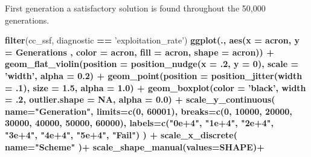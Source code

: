 \documentclass[]{book}
\newenvironment{Shaded}{\begin{snugshade}}{\end{snugshade}}
\newcommand{\DataTypeTok}[1]{\textcolor[rgb]{0.13,0.29,0.53}{#1}}
\newcommand{\DecValTok}[1]{\textcolor[rgb]{0.00,0.00,0.81}{#1}}
\newcommand{\FloatTok}[1]{\textcolor[rgb]{0.00,0.00,0.81}{#1}}
\newcommand{\KeywordTok}[1]{\textcolor[rgb]{0.13,0.29,0.53}{\textbf{#1}}}
\newcommand{\NormalTok}[1]{#1}
\newcommand{\OperatorTok}[1]{\textcolor[rgb]{0.81,0.36,0.00}{\textbf{#1}}}
\newcommand{\OtherTok}[1]{\textcolor[rgb]{0.56,0.35,0.01}{#1}}
\newcommand{\StringTok}[1]{\textcolor[rgb]{0.31,0.60,0.02}{#1}}
\begin{document}
First generation a satisfactory solution is found throughout the 50,000 generations.

\begin{Shaded}
\begin{Highlighting}[]
\KeywordTok{filter}\NormalTok{(cc_ssf, diagnostic }\OperatorTok{==}\StringTok{ 'exploitation_rate'}\NormalTok{) }\OperatorTok{%>%}
\StringTok{  }\KeywordTok{ggplot}\NormalTok{(., }\KeywordTok{aes}\NormalTok{(}\DataTypeTok{x =}\NormalTok{ acron, }\DataTypeTok{y =}\NormalTok{ Generations , }\DataTypeTok{color =}\NormalTok{ acron, }\DataTypeTok{fill =}\NormalTok{ acron, }\DataTypeTok{shape =}\NormalTok{ acron)) }\OperatorTok{+}
\StringTok{  }\KeywordTok{geom_flat_violin}\NormalTok{(}\DataTypeTok{position =} \KeywordTok{position_nudge}\NormalTok{(}\DataTypeTok{x =} \FloatTok{.2}\NormalTok{, }\DataTypeTok{y =} \DecValTok{0}\NormalTok{), }\DataTypeTok{scale =} \StringTok{'width'}\NormalTok{, }\DataTypeTok{alpha =} \FloatTok{0.2}\NormalTok{) }\OperatorTok{+}
\StringTok{  }\KeywordTok{geom_point}\NormalTok{(}\DataTypeTok{position =} \KeywordTok{position_jitter}\NormalTok{(}\DataTypeTok{width =} \FloatTok{.1}\NormalTok{), }\DataTypeTok{size =} \FloatTok{1.5}\NormalTok{, }\DataTypeTok{alpha =} \FloatTok{1.0}\NormalTok{) }\OperatorTok{+}
\StringTok{  }\KeywordTok{geom_boxplot}\NormalTok{(}\DataTypeTok{color =} \StringTok{'black'}\NormalTok{, }\DataTypeTok{width =} \FloatTok{.2}\NormalTok{, }\DataTypeTok{outlier.shape =} \OtherTok{NA}\NormalTok{, }\DataTypeTok{alpha =} \FloatTok{0.0}\NormalTok{) }\OperatorTok{+}
\StringTok{  }\KeywordTok{scale_y_continuous}\NormalTok{(}
    \DataTypeTok{name=}\StringTok{"Generation"}\NormalTok{,}
    \DataTypeTok{limits=}\KeywordTok{c}\NormalTok{(}\DecValTok{0}\NormalTok{, }\DecValTok{60001}\NormalTok{),}
    \DataTypeTok{breaks=}\KeywordTok{c}\NormalTok{(}\DecValTok{0}\NormalTok{, }\DecValTok{10000}\NormalTok{, }\DecValTok{20000}\NormalTok{, }\DecValTok{30000}\NormalTok{, }\DecValTok{40000}\NormalTok{, }\DecValTok{50000}\NormalTok{, }\DecValTok{60000}\NormalTok{),}
    \DataTypeTok{labels=}\KeywordTok{c}\NormalTok{(}\StringTok{"0e+4"}\NormalTok{, }\StringTok{"1e+4"}\NormalTok{, }\StringTok{"2e+4"}\NormalTok{, }\StringTok{"3e+4"}\NormalTok{, }\StringTok{"4e+4"}\NormalTok{, }\StringTok{"5e+4"}\NormalTok{, }\StringTok{"Fail"}\NormalTok{)}
\NormalTok{  ) }\OperatorTok{+}
\StringTok{  }\KeywordTok{scale_x_discrete}\NormalTok{(}
    \DataTypeTok{name=}\StringTok{"Scheme"}
\NormalTok{  )}\OperatorTok{+}
\StringTok{  }\KeywordTok{scale_shape_manual}\NormalTok{(}\DataTypeTok{values=}\NormalTok{SHAPE)}\OperatorTok{+}
}
\end{Highlighting}
\end{Shaded}
\end{document}
